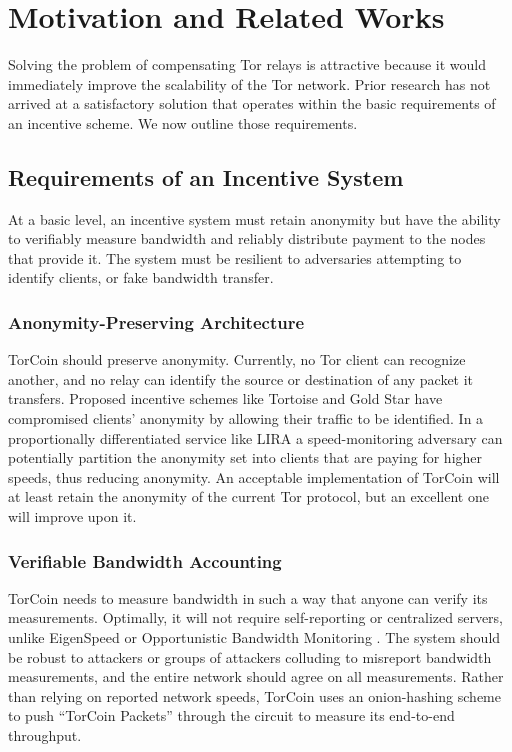 \section{Motivation and Related Works} \label{motivation} Solving the problem of compensating
Tor relays is attractive because it would immediately improve the scalability
of the Tor network. Prior research has not arrived at a satisfactory solution
that operates within the basic requirements of an incentive scheme. We now
outline those requirements.

\subsection{Requirements of an Incentive System} At a basic level, an
incentive system must retain anonymity but have the ability to verifiably
measure bandwidth and reliably distribute payment to the nodes that provide
it. The system must be resilient to adversaries attempting to  identify
clients, or fake bandwidth transfer.

\subsubsection{Anonymity-Preserving Architecture} TorCoin should preserve
anonymity. Currently, no Tor client can recognize another, and no relay can
identify the source or destination of any packet it transfers. Proposed
incentive schemes like Tortoise\cite{acsac11-tortoise} and Gold Star\cite
{incentives-fc10} have compromised clients' anonymity by allowing their
traffic to be identified\cite{jansen2013lira}. In a proportionally differentiated
service \cite{blake1998architecture, dovrolis1999case} like LIRA
\cite{jansen2013lira} a speed-monitoring adversary can potentially partition
the anonymity set into clients that are paying for higher speeds, thus
reducing anonymity. An acceptable implementation of
TorCoin will at least retain the anonymity of the current Tor protocol, but
an excellent one will improve upon it. 

\subsubsection{Verifiable Bandwidth Accounting} TorCoin needs to measure
bandwidth in such a way that anyone can verify its measurements. Optimally, it
will not require self-reporting or centralized servers, unlike EigenSpeed
\cite{snader2009eigenspeed} or Opportunistic Bandwidth Monitoring
\cite{snader2008tune}. The system should be robust to attackers or groups of
attackers colluding to misreport bandwidth measurements, and the entire
network  should agree on all measurements. Rather than relying on reported
network speeds, TorCoin uses an onion-hashing scheme to push
``TorCoin Packets'' through the circuit to measure its end-to-end throughput.

